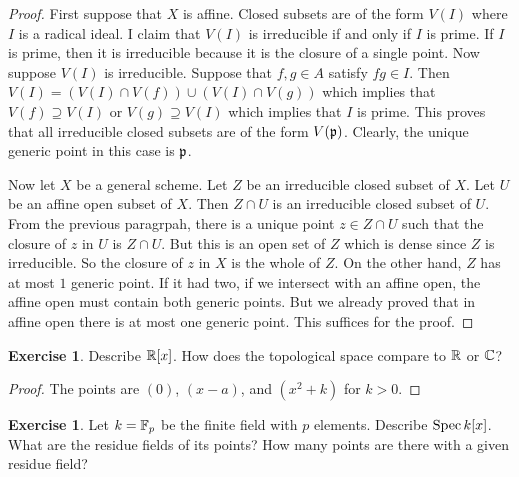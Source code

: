 \documentclass[]{pcmi}
\theoremstyle{plain}
\theoremstyle{definition}
\newtheorem{Exercise}[subsubsection]{Exercise}
\theoremstyle{remark}
\begin{document}
\begin{proof}
    First suppose that $X$ is affine. Closed subsets are of the form $V(I)$ where $I$ is a radical ideal. I claim that $V(I)$ is irreducible if and only if $I$ is prime. If $I$ is prime, then it is irreducible because it is the closure of a single point. Now suppose $V(I)$ is irreducible. Suppose that $f, g \in A$ satisfy $fg \in I$. Then $V(I) = (V(I) \cap V(f)) \cup (V(I) \cap V(g))$ which implies that $V(f) \supseteq V(I)$ or $V(g) \supseteq V(I)$ which implies that $I$ is prime. This proves that all irreducible closed subsets are of the form $V(\mathfrak{p})$. Clearly, the unique generic point in this case is $\mathfrak{p}$.

    Now let $X$ be a general scheme. Let $Z$ be an irreducible closed subset of $X$. Let $U$ be an affine open subset of $X$. Then $Z \cap U$ is an irreducible closed subset of $U$. From the previous paragrpah, there is a unique point $z \in Z \cap U$ such that the closure of $z$ in $U$ is $Z \cap U$. But this is an open set of $Z$ which is dense since $Z$ is irreducible. So the closure of $z$ in $X$ is the whole of $Z$. On the other hand, $Z$ has at most $1$ generic point. If it had two, if we intersect with an affine open, the affine open must contain both generic points. But we already proved that in affine open there is at most one generic point. This suffices for the proof. 
\end{proof}

\begin{Exercise}
    Describe $\mathbb{R}[x]$. How does the topological space compare to $\mathbb{R}$ or $\mathbb{C}$? 
\end{Exercise}

\begin{proof}
    The points are $(0)$, $(x-a)$, and $(x^2 + k)$ for $k > 0$. 
\end{proof}

\begin{Exercise}
    Let $k = \mathbb{F}_p$ be the finite field with $p$ elements. Describe $\operatorname{Spec} k[x]$. What are the residue fields of its points? How many points are there with a given residue field? 
\end{Exercise}
\end{document}
